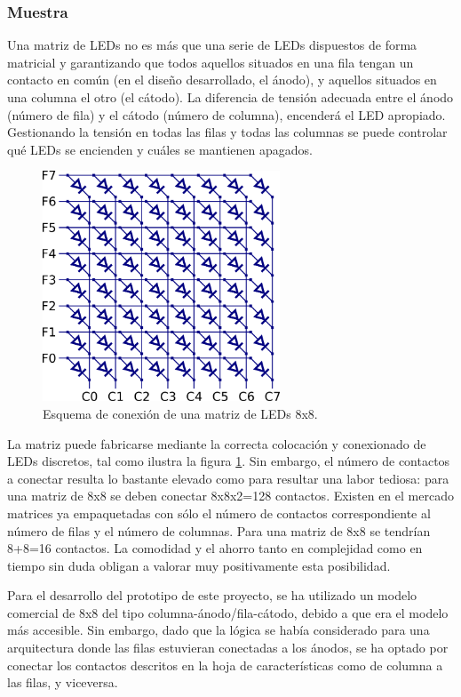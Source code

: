 \subsubsection{Muestra}
\label{subsubsec:muestra}

Una matriz de LEDs no es más que una serie de LEDs dispuestos de forma matricial y garantizando que todos aquellos situados en una fila tengan un contacto en común (en el diseño desarrollado, el ánodo), y aquellos situados en una columna el otro (el cátodo). La diferencia de tensión adecuada entre el ánodo (número de fila) y el cátodo (número de columna), encenderá el LED apropiado. Gestionando la tensión en todas las filas y todas las columnas se puede controlar qué LEDs se encienden y cuáles se mantienen apagados.

\begin{figure}[!htp]
\centering
\includegraphics[width=200pt]{./images/esq_matriz.png}
\caption{Esquema de conexión de una matriz de LEDs 8x8.}
\label{fig:esq_matriz}
\end{figure}

La matriz puede fabricarse mediante la correcta colocación y conexionado de LEDs discretos, tal como ilustra la figura \ref{fig:esq_matriz}. Sin embargo, el número de contactos a conectar resulta lo bastante elevado como para resultar una labor tediosa: para una matriz de 8x8 se deben conectar 8x8x2=128 contactos. Existen en el mercado matrices ya empaquetadas con sólo el número de contactos correspondiente al número de filas y el número de columnas. Para una matriz de 8x8 se tendrían 8+8=16 contactos. La comodidad y el ahorro tanto en complejidad como en tiempo sin duda obligan a valorar muy positivamente esta posibilidad.

Para el desarrollo del prototipo de este proyecto, se ha utilizado un modelo comercial de 8x8\cite{matrix} del tipo columna-ánodo/fila-cátodo, debido a que era el modelo más accesible. Sin embargo, dado que la lógica se había considerado para una arquitectura donde las filas estuvieran conectadas a los ánodos, se ha optado por conectar los contactos descritos en la hoja de características como de columna a las filas, y viceversa.

